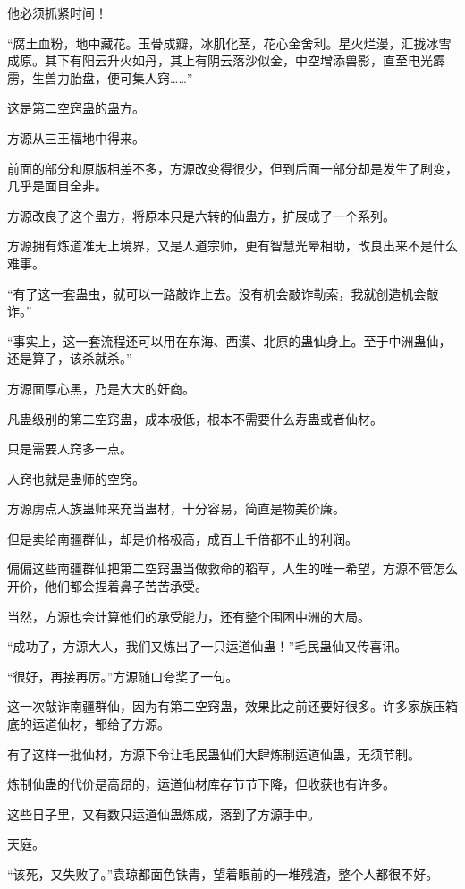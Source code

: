 \begin{this_body}
他必须抓紧时间！

“腐土血粉，地中藏花。玉骨成瓣，冰肌化茎，花心金舍利。星火烂漫，汇拢冰雪成原。其下有阳云升火如丹，其上有阴云落沙似金，中空增添兽影，直至电光霹雳，生兽力胎盘，便可集人窍……”

这是第二空窍蛊的蛊方。

方源从三王福地中得来。

前面的部分和原版相差不多，方源改变得很少，但到后面一部分却是发生了剧变，几乎是面目全非。

方源改良了这个蛊方，将原本只是六转的仙蛊方，扩展成了一个系列。

方源拥有炼道准无上境界，又是人道宗师，更有智慧光晕相助，改良出来不是什么难事。

“有了这一套蛊虫，就可以一路敲诈上去。没有机会敲诈勒索，我就创造机会敲诈。”

“事实上，这一套流程还可以用在东海、西漠、北原的蛊仙身上。至于中洲蛊仙，还是算了，该杀就杀。”

方源面厚心黑，乃是大大的奸商。

凡蛊级别的第二空窍蛊，成本极低，根本不需要什么寿蛊或者仙材。

只是需要人窍多一点。

人窍也就是蛊师的空窍。

方源虏点人族蛊师来充当蛊材，十分容易，简直是物美价廉。

但是卖给南疆群仙，却是价格极高，成百上千倍都不止的利润。

偏偏这些南疆群仙把第二空窍蛊当做救命的稻草，人生的唯一希望，方源不管怎么开价，他们都会捏着鼻子苦苦承受。

当然，方源也会计算他们的承受能力，还有整个围困中洲的大局。

“成功了，方源大人，我们又炼出了一只运道仙蛊！”毛民蛊仙又传喜讯。

“很好，再接再厉。”方源随口夸奖了一句。

这一次敲诈南疆群仙，因为有第二空窍蛊，效果比之前还要好很多。许多家族压箱底的运道仙材，都给了方源。

有了这样一批仙材，方源下令让毛民蛊仙们大肆炼制运道仙蛊，无须节制。

炼制仙蛊的代价是高昂的，运道仙材库存节节下降，但收获也有许多。

这些日子里，又有数只运道仙蛊炼成，落到了方源手中。

天庭。

“该死，又失败了。”袁琼都面色铁青，望着眼前的一堆残渣，整个人都很不好。


\end{this_body}

